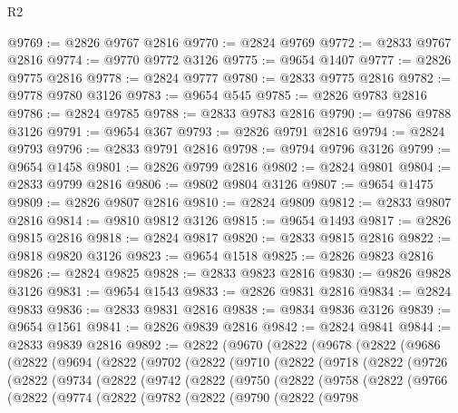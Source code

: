 \begin{lexlean}{R2}
\begin{coremodule}
@9769 := @2826 @9767 @2816
@9770 := @2824 @9769
@9772 := @2833 @9767 @2816
@9774 := @9770 @9772 @3126
@9775 := @9654 @1407
@9777 := @2826 @9775 @2816
@9778 := @2824 @9777
@9780 := @2833 @9775 @2816
@9782 := @9778 @9780 @3126
@9783 := @9654 @545
@9785 := @2826 @9783 @2816
@9786 := @2824 @9785
@9788 := @2833 @9783 @2816
@9790 := @9786 @9788 @3126
@9791 := @9654 @367
@9793 := @2826 @9791 @2816
@9794 := @2824 @9793
@9796 := @2833 @9791 @2816
@9798 := @9794 @9796 @3126
@9799 := @9654 @1458
@9801 := @2826 @9799 @2816
@9802 := @2824 @9801
@9804 := @2833 @9799 @2816
@9806 := @9802 @9804 @3126
@9807 := @9654 @1475
@9809 := @2826 @9807 @2816
@9810 := @2824 @9809
@9812 := @2833 @9807 @2816
@9814 := @9810 @9812 @3126
@9815 := @9654 @1493
@9817 := @2826 @9815 @2816
@9818 := @2824 @9817
@9820 := @2833 @9815 @2816
@9822 := @9818 @9820 @3126
@9823 := @9654 @1518
@9825 := @2826 @9823 @2816
@9826 := @2824 @9825
@9828 := @2833 @9823 @2816
@9830 := @9826 @9828 @3126
@9831 := @9654 @1543
@9833 := @2826 @9831 @2816
@9834 := @2824 @9833
@9836 := @2833 @9831 @2816
@9838 := @9834 @9836 @3126
@9839 := @9654 @1561
@9841 := @2826 @9839 @2816
@9842 := @2824 @9841
@9844 := @2833 @9839 @2816
@9892 := @2822
    (@9670
      (@2822
        (@9678
          (@2822
            (@9686
              (@2822
                (@9694
                  (@2822
                    (@9702
                      (@2822
                        (@9710
                          (@2822
                            (@9718
                              (@2822
                                (@9726
                                  (@2822
                                    (@9734
                                      (@2822
                                        (@9742
                                          (@2822
                                            (@9750
                                              (@2822
                                                (@9758
                                                  (@2822
                                                    (@9766
                                                      (@2822
                                                        (@9774
                                                          (@2822
                                                            (@9782
                                                              (@2822
                                                                (@9790
                                                                  (@2822
                                                                    (@9798

\end{coremodule}
\end{lexlean}
